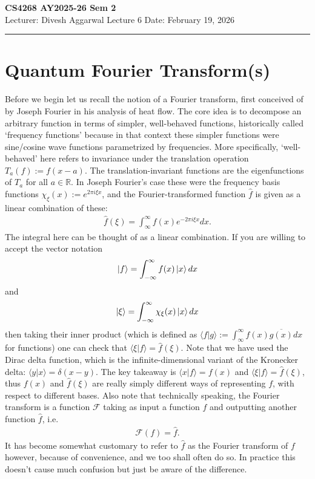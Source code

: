 \noindent
\textbf{CS4268 AY2025-26 Sem 2}
\\
\noindent
Lecturer: Divesh Aggarwal
\hfill
Lecture 6                      %
\hfill
Date: February 19, 2026          %


\noindent
\rule{\textwidth}{1pt}

\medskip

\section{Quantum Fourier Transform(s)}

Before we begin let us recall the notion of a Fourier transform, first conceived of by Joseph Fourier in his analysis of heat flow. The core idea is to decompose an arbitrary function in terms of simpler, well-behaved functions, historically called `frequency functions' because in that context these simpler functions were sine/cosine wave functions parametrized by frequencies. More specifically, `well-behaved' here refers to invariance under the translation operation $T_a(f):=f(x-a)$. The translation-invariant functions are the eigenfunctions of $T_a$ for all $a \in \mathbb{R}$. In Joseph Fourier's case these were 
the frequency basis functions $\chi_\xi(x):= e^{2\pi i \xi x}$, and the Fourier-transformed function $\hat{f}$ is given as a linear combination of these:
\begin{align*}
    \hat{f}(\xi) = \int_{\infty}^{\infty} f(x)e^{-2\pi i \xi x} dx.
\end{align*}
The integral here can be thought of as a linear combination. If you are willing to accept the vector notation
\begin{align*}
    \ket{f} = \int_{-\infty}^\infty f(x) \ket{x} dx
\end{align*}
and 
\begin{align*}
    \ket{\xi} = \int_{-\infty}^\infty \chi_\xi(x) \ket{x} dx
\end{align*}
then taking their inner product (which is defined as $\langle f|g \rangle:= \int_\infty^\infty f(x)\overline{g(x)} dx$ for functions)
one can check that $\langle \xi|f \rangle = \hat{f}(\xi)$. Note that we have used the Dirac delta function, which is the infinite-dimensional variant of the Kronecker delta: $\langle y|x \rangle = \delta(x-y)$. The key takeaway is $\langle x|f \rangle = f(x)$ and $\langle \xi|f \rangle = \hat{f}(\xi)$, thus $f(x)$ and $\hat{f}(\xi)$ are really simply different ways of representing $f$, with respect to different bases. Also note that technically speaking, the Fourier transform is a function $\mathcal{F}$ taking as input a function $f$ and outputting another function $\hat{f}$, i.e.
\begin{align*}
    \mathcal{F}(f) = \hat{f}.
\end{align*}
It has become somewhat customary to refer to $\hat{f}$ as the Fourier transform of $f$ however, because of convenience, and we too shall often do so. In practice this doesn't cause much confusion but just be aware of the difference.

